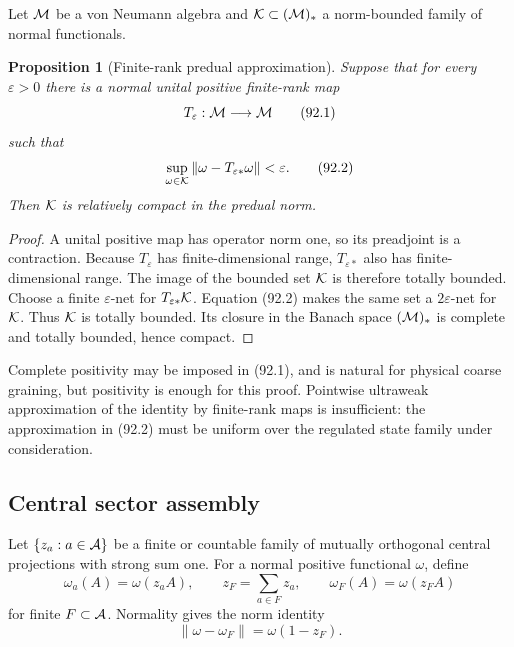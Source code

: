 \documentclass[11pt]{article}
\newtheorem{proposition}[theorem]{Proposition}
\theoremstyle{remark}
\begin{document}
Let \({\cal M}\) be a von Neumann algebra and
\({\cal K}\subset({\cal M})_*\) a norm-bounded family of normal
functionals.

\begin{proposition}[Finite-rank predual approximation]
\label{prop:v12v92-finite-rank}
Suppose that for every \(\varepsilon>0\) there is a normal unital
positive finite-rank map
\[
 T_\varepsilon:{\cal M}\longrightarrow{\cal M}                  \tag{92.1}
\]
such that
\[
 \sup_{\omega\in{\cal K}}
 \|\omega-T_{\varepsilon *}\omega\|<\varepsilon.                 \tag{92.2}
\]
Then \({\cal K}\) is relatively compact in the predual norm.
\end{proposition}

\begin{proof}
A unital positive map has operator norm one, so its preadjoint is a
contraction.  Because \(T_\varepsilon\) has finite-dimensional
range, \(T_{\varepsilon *}\) also has finite-dimensional range.
The image of the bounded set \({\cal K}\) is therefore totally
bounded.  Choose a finite \(\varepsilon\)-net for
\(T_{\varepsilon *}{\cal K}\).  Equation (92.2) makes the same set a
\(2\varepsilon\)-net for \({\cal K}\).  Thus \({\cal K}\) is totally
bounded.  Its closure in the Banach space \(({\cal M})_*\) is
complete and totally bounded, hence compact.
\end{proof}

Complete positivity may be imposed in (92.1), and is natural for
physical coarse graining, but positivity is enough for this proof.
Pointwise ultraweak approximation of the identity by finite-rank
maps is insufficient: the approximation in (92.2) must be uniform
over the regulated state family under consideration.

\subsection{Central sector assembly}

Let \(\{z_a:a\in{\cal A}\}\) be a finite or countable family of
mutually orthogonal central projections with strong sum one.  For a
normal positive functional \(\omega\), define
\[
 \omega_a(A)=\omega(z_aA),\qquad
 z_F=\sum_{a\in F}z_a,\qquad
 \omega_F(A)=\omega(z_FA)                                       \tag{92.3}
\]
for finite \(F\subset{\cal A}\).  Normality gives the norm identity
\[
 \|\omega-\omega_F\|=\omega(1-z_F).                              \tag{92.4}
\]
\end{document}
